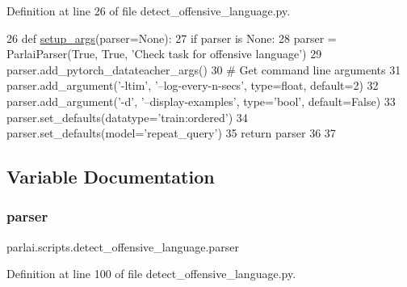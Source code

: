 Definition at line 26 of file detect\+\_\+offensive\+\_\+language.\+py.


\begin{DoxyCode}
26 \textcolor{keyword}{def }\hyperlink{namespaceparlai_1_1scripts_1_1detect__offensive__language_ab3f20447fd2442afdcd45dd77b619378}{setup\_args}(parser=None):
27     \textcolor{keywordflow}{if} parser \textcolor{keywordflow}{is} \textcolor{keywordtype}{None}:
28         parser = ParlaiParser(\textcolor{keyword}{True}, \textcolor{keyword}{True}, \textcolor{stringliteral}{'Check task for offensive language'})
29     parser.add\_pytorch\_datateacher\_args()
30     \textcolor{comment}{# Get command line arguments}
31     parser.add\_argument(\textcolor{stringliteral}{'-ltim'}, \textcolor{stringliteral}{'--log-every-n-secs'}, type=float, default=2)
32     parser.add\_argument(\textcolor{stringliteral}{'-d'}, \textcolor{stringliteral}{'--display-examples'}, type=\textcolor{stringliteral}{'bool'}, default=\textcolor{keyword}{False})
33     parser.set\_defaults(datatype=\textcolor{stringliteral}{'train:ordered'})
34     parser.set\_defaults(model=\textcolor{stringliteral}{'repeat\_query'})
35     \textcolor{keywordflow}{return} parser
36 
37 
\end{DoxyCode}


\subsection{Variable Documentation}
\mbox{\label{namespaceparlai_1_1scripts_1_1detect__offensive__language_a1911e11825f0b58da4e082a1697d968c}} 
\subsubsection{\texorpdfstring{parser}{parser}}
{\footnotesize\ttfamily parlai.\+scripts.\+detect\+\_\+offensive\+\_\+language.\+parser}



Definition at line 100 of file detect\+\_\+offensive\+\_\+language.\+py.

\mbox{\label{namespaceparlai_1_1scripts_1_1detect__offensive__language_a6d984125c3831773988d61d36c68dc60}} 
